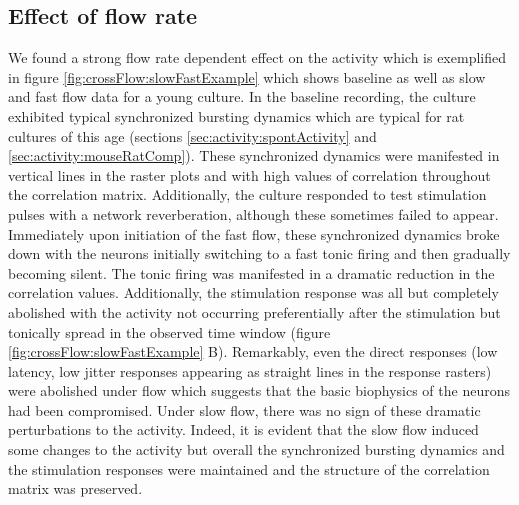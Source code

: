         \subsection{Effect of flow rate}
        \label{sec:crossFlow:slowFast}
        We found a strong flow rate dependent effect on the activity which is exemplified in figure \ref{fig:crossFlow:slowFastExample} which shows baseline as well as slow and fast flow data for a young culture. In the baseline recording, the culture exhibited typical synchronized bursting dynamics which are typical for rat cultures of this age (sections \ref{sec:activity:spontActivity} and \ref{sec:activity:mouseRatComp}). These synchronized dynamics were manifested in vertical lines in the raster plots and with high values of correlation throughout the correlation matrix. Additionally, the culture responded to test stimulation pulses with a network reverberation, although these sometimes failed to appear. Immediately upon initiation of the fast flow, these synchronized dynamics broke down with the neurons initially switching to a fast tonic firing and then gradually becoming silent. The tonic firing was manifested in a dramatic reduction in the correlation values. Additionally, the stimulation response was all but completely abolished with the activity not occurring preferentially after the stimulation but tonically spread in the observed time window (figure \ref{fig:crossFlow:slowFastExample} B). Remarkably, even the direct responses (low latency, low jitter responses appearing as straight lines in the response rasters) were abolished under flow which suggests that the basic biophysics of the neurons had been compromised. Under slow flow, there was no sign of these dramatic perturbations to the activity. Indeed, it is evident that the slow flow induced some changes to the activity but overall the synchronized bursting dynamics and the stimulation responses were maintained and the structure of the correlation matrix was preserved.

